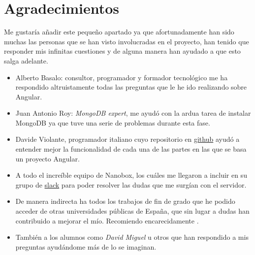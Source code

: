 \section{Agradecimientos}\label{reconocimientos}
Me gustaría añadir este pequeño apartado ya que afortunadamente han sido muchas las personas que se han visto involucradas en el proyecto, han tenido que responder mis infinitas cuestiones y de alguna manera han ayudado a que esto salga adelante. 
\begin{itemize}
		\item Alberto Basalo: consultor, programador y formador tecnológico me ha respondido altruistamente todas las preguntas que le he ido realizando sobre Angular. 
		\item Juan Antonio Roy: \emph{MongoDB expert}, me ayudó con la ardua tarea de instalar MongoDB ya que tuve una serie de problemas durante esta fase. 
		\item Davide Violante, programador italiano cuyo repositorio en \href{https://github.com/DavideViolante/Angular-Full-Stack}{github} ayudó a entender mejor la funcionalidad de cada una de las partes en las que se basa un proyecto Angular. 
		\item A todo el increíble equipo de Nanobox, los cuáles me llegaron a incluir en su grupo de \href{https://slack.com/}{slack} para poder resolver las dudas que me surgían con el servidor.
		\item De manera indirecta ha todos los trabajos de fin de grado que he podido acceder de otras universidades públicas de España, que sin lugar a dudas han contribuido a mejorar el mío. Recomiendo encarecidamente \cite{tfg1,tfg2,tfg3,tfg4}.
		\item También a los alumnos como \emph{David Miguel} u otros que han respondido a mis preguntas ayudándome más de lo se imaginan.
\end{itemize}


 
 